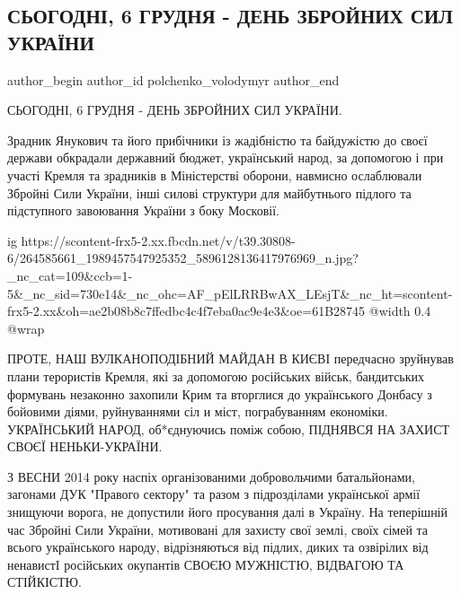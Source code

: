 
 
 
 
 
 
\subsection{СЬОГОДНІ, 6 ГРУДНЯ - ДЕНЬ ЗБРОЙНИХ СИЛ УКРАЇНИ}
\label{sec:06_12_2021.fb.polchenko_volodymyr.1.den_zsu}
 
\ifcmt
 author_begin
   author_id polchenko_volodymyr
 author_end
\fi

СЬОГОДНІ, 6 ГРУДНЯ - ДЕНЬ ЗБРОЙНИХ СИЛ УКРАЇНИ. 

Зрадник Янукович та його прибічники із жадібністю та байдужістю до
своєї держави обкрадали державний бюджет, український народ, за
допомогою і при участі Кремля та зрадників в Міністерстві оборони,
навмисно ослаблювали Збройні Сили України, інші силові структури для
майбутнього підлого та підступного завоювання України з боку Московії. 

\ifcmt
  ig https://scontent-frx5-2.xx.fbcdn.net/v/t39.30808-6/264585661_1989457547925352_5896128136417976969_n.jpg?_nc_cat=109&ccb=1-5&_nc_sid=730e14&_nc_ohc=AF_pElLRRBwAX_LEsjT&_nc_ht=scontent-frx5-2.xx&oh=ae2b08b8c7ffedbc4c4f7eba0ac9e4e3&oe=61B28745
  @width 0.4
  @wrap 
\fi

ПРОТЕ, НАШ ВУЛКАНОПОДІБНИЙ МАЙДАН В КИЄВІ передчасно зруйнував
плани терористів Кремля, які за допомогою російських військ,
бандитських формувань незаконно захопили Крим та вторглися до
українського Донбасу з бойовими діями, руйнуваннями сіл и міст,
пограбуванням економіки. УКРАЇНСЬКИЙ НАРОД, об*єднуючись поміж
собою, ПІДНЯВСЯ НА ЗАХИСТ СВОЄЇ НЕНЬКИ-УКРАЇНИ. 

З ВЕСНИ 2014 року наспіх організованими добровольчими батальйонами, загонами
ДУК "Правого сектору" та разом з підрозділами української армії знищуючи
ворога, не допустили його просування далі в Україну. На теперішній час Збройні
Сили України, мотивовані для захисту свої землі, своїх сімей та всього
українського народу, відрізняються від підлих, диких та озвірілих від ненавистІ
російських окупантів СВОЄЮ МУЖНІСТЮ, ВІДВАГОЮ ТА СТІЙКІСТЮ. 

